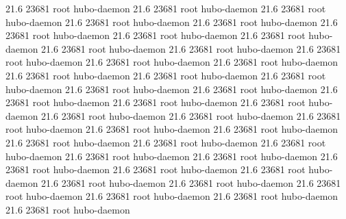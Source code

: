 21.6 23681 root     hubo-daemon
21.6 23681 root     hubo-daemon
21.6 23681 root     hubo-daemon
21.6 23681 root     hubo-daemon
21.6 23681 root     hubo-daemon
21.6 23681 root     hubo-daemon
21.6 23681 root     hubo-daemon
21.6 23681 root     hubo-daemon
21.6 23681 root     hubo-daemon
21.6 23681 root     hubo-daemon
21.6 23681 root     hubo-daemon
21.6 23681 root     hubo-daemon
21.6 23681 root     hubo-daemon
21.6 23681 root     hubo-daemon
21.6 23681 root     hubo-daemon
21.6 23681 root     hubo-daemon
21.6 23681 root     hubo-daemon
21.6 23681 root     hubo-daemon
21.6 23681 root     hubo-daemon
21.6 23681 root     hubo-daemon
21.6 23681 root     hubo-daemon
21.6 23681 root     hubo-daemon
21.6 23681 root     hubo-daemon
21.6 23681 root     hubo-daemon
21.6 23681 root     hubo-daemon
21.6 23681 root     hubo-daemon
21.6 23681 root     hubo-daemon
21.6 23681 root     hubo-daemon
21.6 23681 root     hubo-daemon
21.6 23681 root     hubo-daemon
21.6 23681 root     hubo-daemon
21.6 23681 root     hubo-daemon
21.6 23681 root     hubo-daemon
21.6 23681 root     hubo-daemon
21.6 23681 root     hubo-daemon
21.6 23681 root     hubo-daemon
21.6 23681 root     hubo-daemon
21.6 23681 root     hubo-daemon
21.6 23681 root     hubo-daemon
21.6 23681 root     hubo-daemon
